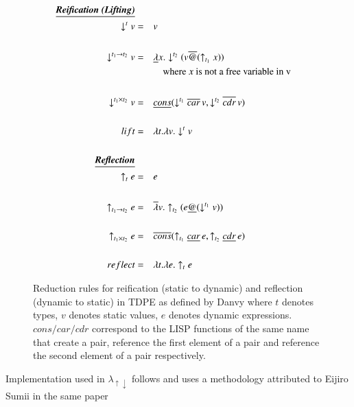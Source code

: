 \documentclass[a4paper,12pt,twoside,openright]{report}
\theoremstyle{definition}
\newcommand{\mslang}{$\lambda_{\uparrow\downarrow}$}
\begin{document}
\begin{figure}[htp!]
    \centering
    \begin{alignat}{2}
        \text{\underline{\textbf{\emph{Reification (Lifting)}}}}\nonumber \\
        \downarrow^{t} v & = && v \\
        \nonumber \\%
        \downarrow^{t_{1} \rightarrow t_{2}} v & = && \underline{\lambda} x.\downarrow^{t_{2}}(v\overline{@}(\uparrow_{t_{1}} x)) \\
        & && \quad\text{where $x$ is not a free variable in v} \nonumber \\
        \nonumber \\%
        \downarrow^{t_{1} \times t_{2}} v & = && \underline{cons}(\downarrow^{t_{1}} \overline{car} \, v, \downarrow^{t_{2}} \overline{cdr} \, v) \\
        \nonumber \\%
        lift & = && \lambda t. \lambda v. \downarrow^{t} v \\
        \nonumber \\%
        \text{\underline{\textbf{\emph{Reflection}}}}\nonumber \\
        \uparrow_{t} e & = && e \\
        \nonumber \\%
        \uparrow_{t_{1} \rightarrow t_{2}} e & = && \overline{\lambda} v.\uparrow_{t_{2}}(e\underline{@}(\downarrow^{t_{1}} v)) \\
        \nonumber \\%
        \uparrow_{t_{1} \times t_{2}} e & = && \overline{cons}(\uparrow_{t_{1}} \underline{car} \, e, \uparrow_{t_{2}} \underline{cdr} \, e) \\
        \nonumber \\%
        reflect & = && \lambda t. \lambda e. \uparrow_{t} e
    \end{alignat}
    \caption{Reduction rules for reification (static to dynamic) and reflection (dynamic to static) in TDPE as defined by Danvy \cite{danvy1999type} where $t$ denotes types, $v$ denotes static values, $e$ denotes dynamic expressions. $cons/car/cdr$ correspond to the LISP functions of the same name that create a pair, reference the first element of a pair and reference the second element of a pair respectively.}
    \label{fig:tdpe_rules}
\end{figure}

Implementation used in \mslang{} follows \cite{danvy1999type} and uses a methodology attributed to Eijiro Sumii in the same paper
\end{document}
